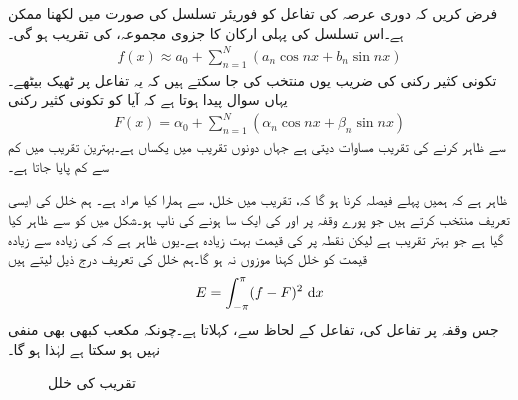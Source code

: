 فرض کریں کہ  دوری عرصہ کی تفاعل  کو فوریئر تسلسل کی صورت میں لکھنا ممکن ہے۔اس تسلسل کی پہلی  ارکان کا جزوی مجموعہ،  کی تقریب ہو گی۔
\begin{align}\label{مساوات_فوریئر_تقریب_الف}
f(x)\approx a_0+\sum\limits_{n=1}^{N}(a_n\cos nx+b_n\sin nx)
\end{align}
تکونی کثیر رکنی کی  ضریب  یوں منتخب کی جا سکتے ہیں  کہ یہ تفاعل پر ٹھیک بیٹھے۔یہاں سوال پیدا ہوتا ہے کہ آیا  کو تکونی کثیر رکنی
\begin{align}\label{مساوات_فوریئر_تقریب_ب}
F(x)=\alpha_0+\sum\limits_{n=1}^{N} (\alpha_n \cos nx+\beta_n\sin nx)
\end{align}
سے ظاہر کرنے کی  تقریب مساوات  دیتی ہے جہاں دونوں تقریب میں  یکساں ہے۔بہترین تقریب  میں کم سے کم  پایا جاتا ہے۔

ظاہر ہے کہ ہمیں پہلے  فیصلہ کرنا ہو گا کہ، تقریب میں  خلل، سے ہمارا کیا مراد ہے۔ ہم خلل کی ایسی تعریف منتخب کرتے ہیں جو پورے وقفہ  پر  اور  کی ایک سا ہونے کی ناپ ہو۔شکل  میں  کو  سے ظاہر کیا گیا ہے جو بہتر تقریب ہے لیکن نقطہ  پر  کی قیمت بہت زیادہ ہے۔یوں ظاہر ہے کہ  کی زیادہ سے زیادہ قیمت کو خلل کہنا موزوں نہ ہو گا۔ہم خلل کی تعریف درج ذیل لیتے ہیں
\begin{align}\label{مساوات_فوریئر_تقریب_پ}
E=\int_{-\pi}^{\pi} (f-F)^2\,\dif x
\end{align}
جس وقفہ  پر تفاعل  کی، تفاعل  کے لحاظ سے،   کہلاتا ہے۔چونکہ مکعب کبھی بھی منفی نہیں ہو سکتا ہے لہٰذا  ہو گا۔
\begin{figure}
\centering
{}
\caption{تقریب کی خلل}
\label{شکل_فوریئر_خلل_تقریب}
\end{figure}

